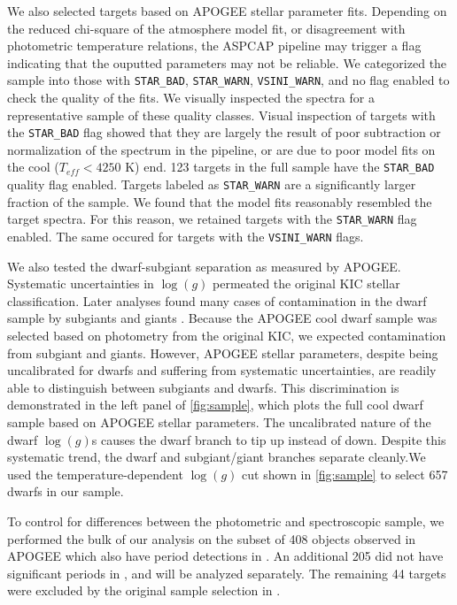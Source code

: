 \documentclass[manuscript]{aastex6}
\newcommand{\Teff}{\ensuremath{T_{eff}}}
\newcommand{\logg}{\ensuremath{\log(g)}}
\newcommand{\STARBAD}{\texttt{STAR\_BAD}}
\newcommand{\STARWARN}{\texttt{STAR\_WARN}}
\newcommand{\VSINIWARN}{\texttt{VSINI\_WARN}}
\begin{document}
We also selected targets based on APOGEE stellar parameter fits.
Depending on the reduced chi-square of the atmosphere model fit, or
disagreement with photometric temperature relations, the ASPCAP pipeline
may trigger a flag indicating that the ouputted parameters may not be
reliable. We categorized the sample into those with \STARBAD, \STARWARN,
\VSINIWARN{}, and no flag enabled to check the quality of the fits. We
visually inspected the spectra for a representative sample of these
quality classes. 
Visual inspection of targets with the \STARBAD{} flag showed that they are 
largely the result of poor subtraction or normalization of the spectrum in the
pipeline, or are due to poor model fits on the cool (\(\Teff < 4250\) K) end. 
123 targets in the full sample have the \STARBAD{} quality flag enabled. 
Targets labeled as \STARWARN{} are a significantly larger fraction of the 
sample. We found that the model fits reasonably resembled the target spectra. 
For this reason, we retained targets with the \STARWARN{} flag enabled. The 
same occured for targets with the \VSINIWARN{} flags.

We also tested the dwarf-subgiant separation as measured by APOGEE\@. Systematic 
uncertainties in \logg{} permeated the original KIC stellar
classification. Later analyses found many cases of contamination in the dwarf 
sample by subgiants 
and giants \citep{Mann12,Gaidos13}. Because the APOGEE cool dwarf sample was 
selected based on photometry from the original KIC, we expected contamination 
from subgiant and giants. However, APOGEE stellar parameters, 
despite being uncalibrated for dwarfs and suffering from 
systematic uncertainties, are readily able to distinguish between subgiants and 
dwarfs. This discrimination is demonstrated in the left panel of 
\cref{fig:sample}, which plots the full cool dwarf sample based on
APOGEE stellar parameters. The uncalibrated nature of the dwarf
\logg{}s causes the dwarf branch to tip up instead of down. Despite this
systematic trend, the dwarf and subgiant/giant branches separate
cleanly.We used the temperature-dependent \logg{} cut shown in 
\cref{fig:sample} to select 657 dwarfs in our sample. 

To control for differences between the photometric and spectroscopic sample,
we performed the bulk of our analysis on the subset of 408 objects
observed in APOGEE which also have period detections in \citet{McQuillan14}.
An additional 205 did not have significant periods in \citet{McQuillan14}, and
will be analyzed separately. The remaining 44 targets were excluded by
the original sample selection in \citet{McQuillan14}. 
\end{document}
